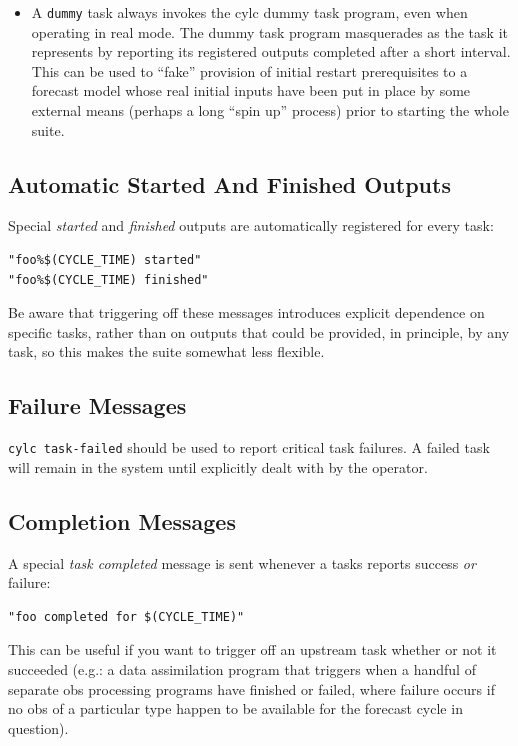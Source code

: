\documentclass[11pt,a4paper]{article}
\begin{document}
\begin{itemize}
    \item A \lstinline=dummy= task always invokes the cylc dummy task
        program, even when operating in real mode.  The dummy task
        program masquerades as the task it represents by reporting its
        registered outputs completed after a short interval. This can be
        used to ``fake'' provision of initial restart prerequisites to a
        forecast model whose real initial inputs have been put in place
        by some external means (perhaps a long ``spin up'' process)
        prior to starting the whole suite.

\end{itemize}



\subsection{Automatic Started And Finished Outputs}

Special {\em started} and {\em finished} outputs are automatically
registered for every task: 

\begin{lstlisting}
"foo%$(CYCLE_TIME) started"
"foo%$(CYCLE_TIME) finished"
\end{lstlisting}

Be aware that triggering off these messages introduces explicit
dependence on specific tasks, rather than on outputs that could be
provided, in principle, by any task, so this makes the suite somewhat
less flexible.


\subsection{Failure Messages}

\lstinline=cylc task-failed= should be used to report critical task
failures. A failed task will remain in the system until explicitly dealt
with by the operator.

\subsection{Completion Messages}

A special {\em task completed} message is sent whenever a tasks reports
success {\em or} failure:
\begin{lstlisting}
"foo completed for $(CYCLE_TIME)"
\end{lstlisting}
 
This can be useful if you want to trigger off an upstream task whether
or not it succeeded (e.g.: a data assimilation program that triggers
when a handful of separate obs processing programs have finished or
failed, where failure occurs if no obs of a particular type happen to be
available for the forecast cycle in question).
\end{document}
